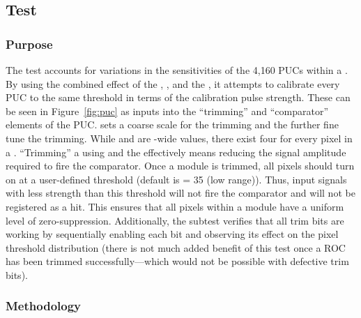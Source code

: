 
\newpage

\subsection{\trimming Test}
\label{ss:trimming}

\subsubsection{Purpose}

The \trimming test accounts for variations in the sensitivities of the 4,160 PUCs within a \roc.
By using the combined effect of the \vthrcomp, \vtrim, and the \trimbits,
it attempts to calibrate every PUC to the same threshold in terms of the calibration pulse strength.
These \dacs can be seen in Figure~\ref{fig:puc} as inputs into the ``trimming'' and ``comparator'' elements of the PUC.
\vtrim sets a coarse scale for the trimming and the \trimbits further fine tune the trimming.
While \vthrcomp and \vtrim are \roc-wide values, there exist four \trimbits for every pixel in a \roc.
``Trimming'' a \roc using \vtrim and the \trimbits effectively means reducing the signal amplitude required to fire the comparator.
Once a module is trimmed, all pixels should turn on at a user-defined threshold (default is \vcal = 35 (low range)).
Thus, input signals with less strength than this threshold will not fire the comparator and will not be registered as a hit.
This ensures that all pixels within a module have a uniform level of zero-suppression.
Additionally, the \trimbit subtest verifies that all trim bits are working
by sequentially enabling each bit and observing its effect on the
pixel threshold distribution (there is not much added benefit of this
test once a ROC has been trimmed successfully---which would not be
possible with defective trim bits). 

\subsubsection{Methodology}

